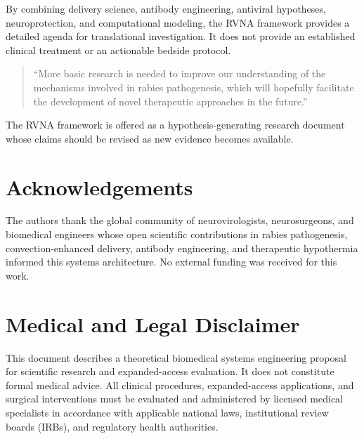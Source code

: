 \documentclass[12pt,a4paper]{article}
\begin{document}
By combining delivery science, antibody engineering, antiviral hypotheses, neuroprotection, and computational modeling, the RVNA framework provides a detailed agenda for translational investigation. It does not provide an established clinical treatment or an actionable bedside protocol.

\begin{quote}
``More basic research is needed to improve our understanding of the mechanisms involved in rabies pathogenesis, which will hopefully facilitate the development of novel therapeutic approaches in the future.'' \citep{jackson2011therapy}
\end{quote}

The RVNA framework is offered as a hypothesis-generating research document whose claims should be revised as new evidence becomes available.

\section*{Acknowledgements}
The authors thank the global community of neurovirologists, neurosurgeons, and biomedical engineers whose open scientific contributions in rabies pathogenesis, convection-enhanced delivery, antibody engineering, and therapeutic hypothermia informed this systems architecture. No external funding was received for this work.

\section*{Medical and Legal Disclaimer}
This document describes a theoretical biomedical systems engineering proposal for scientific research and expanded-access evaluation. It does not constitute formal medical advice. All clinical procedures, expanded-access applications, and surgical interventions must be evaluated and administered by licensed medical specialists in accordance with applicable national laws, institutional review boards (IRBs), and regulatory health authorities.


\end{document}
